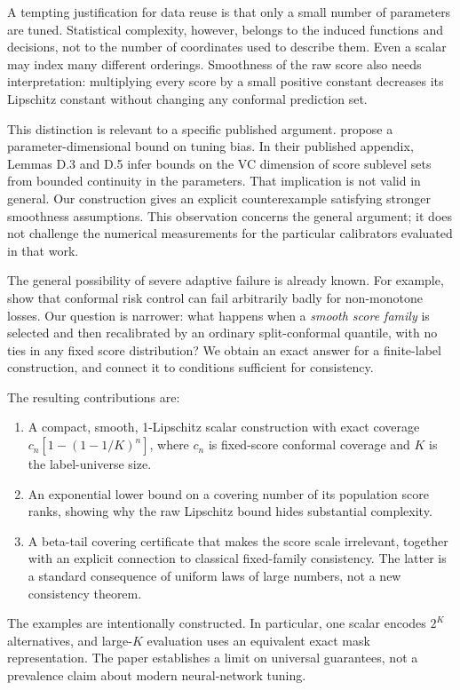 \documentclass{article}
\begin{document}
A tempting justification for data reuse is that only a small number of parameters are tuned. Statistical complexity, however, belongs to the induced functions and decisions, not to the number of coordinates used to describe them. Even a scalar may index many different orderings. Smoothness of the raw score also needs interpretation: multiplying every score by a small positive constant decreases its Lipschitz constant without changing any conformal prediction set.

This distinction is relevant to a specific published argument. \citet{zeng2025} propose a parameter-dimensional bound on tuning bias. In their published appendix, Lemmas D.3 and D.5 infer bounds on the VC dimension of score sublevel sets from bounded continuity in the parameters. That implication is not valid in general. Our construction gives an explicit counterexample satisfying stronger smoothness assumptions. This observation concerns the general argument; it does not challenge the numerical measurements for the particular calibrators evaluated in that work.

The general possibility of severe adaptive failure is already known. For example, \citet{crc2024} show that conformal risk control can fail arbitrarily badly for non-monotone losses. Our question is narrower: what happens when a \emph{smooth score family} is selected and then recalibrated by an ordinary split-conformal quantile, with no ties in any fixed score distribution? We obtain an exact answer for a finite-label construction, and connect it to conditions sufficient for consistency.

The resulting contributions are:
\begin{enumerate}
\item A compact, smooth, 1-Lipschitz scalar construction with exact coverage $c_n[1-(1-1/K)^n]$, where $c_n$ is fixed-score conformal coverage and $K$ is the label-universe size.
\item An exponential lower bound on a covering number of its population score ranks, showing why the raw Lipschitz bound hides substantial complexity.
\item A beta-tail covering certificate that makes the score scale irrelevant, together with an explicit connection to classical fixed-family consistency. The latter is a standard consequence of uniform laws of large numbers, not a new consistency theorem.
\end{enumerate}

The examples are intentionally constructed. In particular, one scalar encodes $2^K$ alternatives, and large-$K$ evaluation uses an equivalent exact mask representation. The paper establishes a limit on universal guarantees, not a prevalence claim about modern neural-network tuning.
\end{document}
